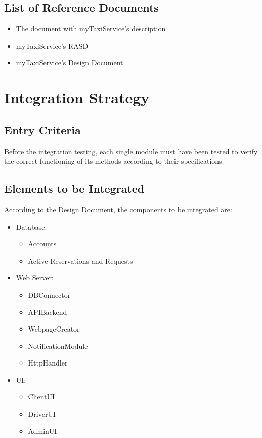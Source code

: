 \documentclass{article}
\begin{document}
\subsection{List of Reference Documents}
\begin{itemize}
	\item The document with myTaxiService's description
	\item myTaxiService's RASD
	\item myTaxiService's Design Document
\end{itemize}
\section{Integration Strategy}
\subsection{Entry Criteria}
Before the integration testing, each single module must have been tested to verify the correct functioning of its methods according to their specifications.
\subsection{Elements to be Integrated}
According to the Design Document, the components to be integrated are:
\begin{itemize}
	\item Database: 
	\begin{itemize}
		\item Accounts
		\item Active Reservations and Requests
	\end{itemize}
	\item Web Server: 
	\begin{itemize}
		\item DBConnector
		\item APIBackend
		\item WebpageCreator
		\item NotificationModule
		\item HttpHandler
	\end{itemize}
	\item UI:\@
	\begin{itemize}
		\item ClientUI
		\item DriverUI
		\item AdminUI
	\end{itemize}
\end{itemize}
\end{document}
